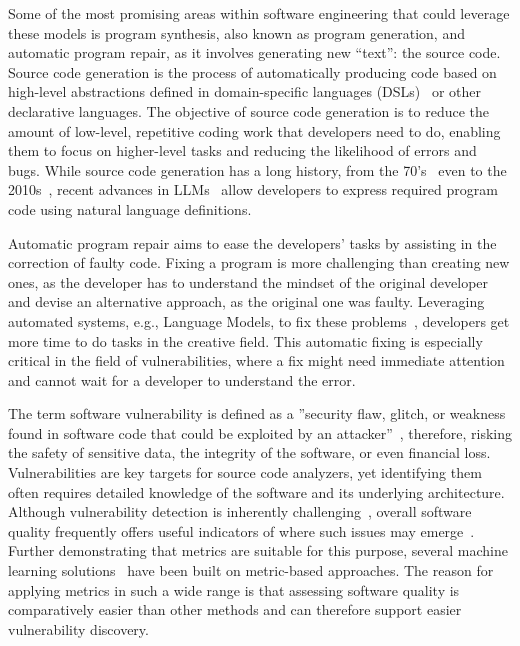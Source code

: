 Some of the most promising areas within software engineering that could leverage these models is program synthesis, also known as program generation, and automatic program repair, as it involves generating new ``text'': the source code.
Source code generation is the process of automatically producing code based on high-level abstractions defined in domain-specific languages (DSLs)~\cite{codegen_dsl} or other declarative languages.
The objective of source code generation is to reduce the amount of low-level, repetitive coding work that developers need to do, enabling them to focus on higher-level tasks and reducing the likelihood of errors and bugs.
While source code generation has a long history, from the 70's~\cite{old_code_gen} even to the 2010s~\cite{dsl_recent}, recent advances in LLMs~\cite{codex} allow developers to express required program code using natural language definitions.

Automatic program repair aims to ease the developers' tasks by assisting in the correction of faulty code.
Fixing a program is more challenging than creating new ones, as the developer has to understand the mindset of the original developer and devise an alternative approach, as the original one was faulty.
Leveraging automated systems, e.g., Language Models, to fix these problems~\cite{conversational_bug_fix_1, same_as_us_but_too_much_hint}, developers get more time to do tasks in the creative field.
This automatic fixing is especially critical in the field of vulnerabilities, where a fix might need immediate attention and cannot wait for a developer to understand the error.

The term software vulnerability is defined as a ''security flaw, glitch, or weakness found in software code that could be exploited by an attacker''~\cite{vuln_def}, therefore, risking the safety of sensitive data, the integrity of the software, or even financial loss.
Vulnerabilities are key targets for source code analyzers, yet identifying them often requires detailed knowledge of the software and its underlying architecture.
Although vulnerability detection is inherently challenging~\cite{vuln_det_challenges}, overall software quality frequently offers useful indicators of where such issues may emerge~\cite{metrics_for_vuln_det}.
Further demonstrating that metrics are suitable for this purpose, several machine learning solutions~\cite{ml_vuln_det,mv_vuln_det_2} have been built on metric-based approaches.
The reason for applying metrics in such a wide range is that assessing software quality is comparatively easier than other methods and can therefore support easier vulnerability discovery.

